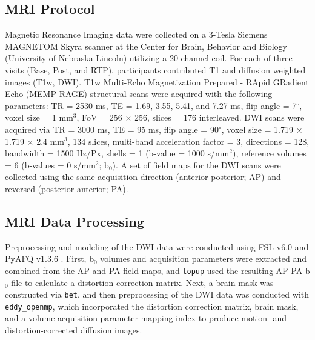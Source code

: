 \documentclass[12pt]{article}
\begin{document}
\subsection{MRI Protocol}
\label{ssec:meth-mri}
Magnetic Resonance Imaging data were collected on a 3-Tesla Siemens MAGNETOM Skyra scanner at the Center for Brain, Behavior and Biology (University of Nebraska-Lincoln) utilizing a 20-channel coil. For each of three visits (Base, Post, and RTP), participants contributed T1 and diffusion weighted images (T1w, DWI). T1w Multi-Echo Magnetization Prepared - RApid GRadient Echo (MEMP-RAGE) structural scans were acquired with the following parameters: TR = 2530 ms, TE = 1.69, 3.55, 5.41, and 7.27 ms, flip angle = 7$^{\circ}$, voxel size = 1 mm$^3$, FoV = 256 $\times$ 256, slices = 176 interleaved. DWI scans were acquired via TR = 3000 ms, TE = 95 ms, flip angle = 90$^{\circ}$, voxel size = 1.719 $\times$ 1.719 $\times$ 2.4 mm$^3$, 134 slices, multi-band acceleration factor = 3, directions = 128, bandwidth = 1500 Hz/Px, shells = 1 (b-value = 1000 s/mm$^2$), reference volumes = 6 (b-values = 0 s/mm$^2$; b$_0$). A set of field maps for the DWI scans were collected using the same acquisition direction (anterior-posterior; AP) and reversed (posterior-anterior; PA).


\subsection{MRI Data Processing}
\label{ssec:meth-mri-proc}
Preprocessing and modeling of the DWI data were conducted using FSL v6.0 \parencite{jenkinson2012Fsl} and PyAFQ v1.3.6 \parencite{kruper2021EvaluatingReliabilityHuman,yeatman2012TractProfilesWhite}. First, b$_0$ volumes and acquisition parameters were extracted and combined from the AP and PA field maps, and \lstinline{topup} used the resulting AP-PA b$_0$ file to calculate a distortion correction matrix. Next, a brain mask was constructed via \lstinline{bet}, and then preprocessing of the DWI data was conducted with \lstinline{eddy_openmp}, which incorporated the distortion correction matrix, brain mask, and a volume-acquisition parameter mapping index to produce motion- and distortion-corrected diffusion images.
\end{document}
